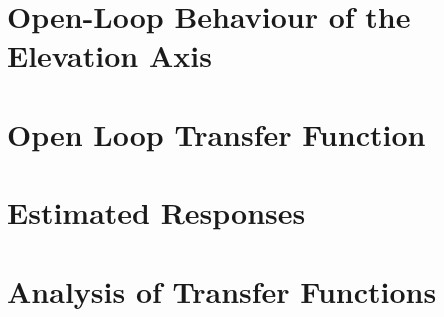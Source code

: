 \section{Open-Loop Behaviour of the Elevation
Axis}\label{open-loop-behaviour-of-the-elevation-axis}

\section{Open Loop Transfer Function}\label{open-loop-transfer-function}

\section{Estimated Responses}\label{estimated-responses}

\section{Analysis of Transfer
Functions}\label{analysis-of-transfer-functions}
